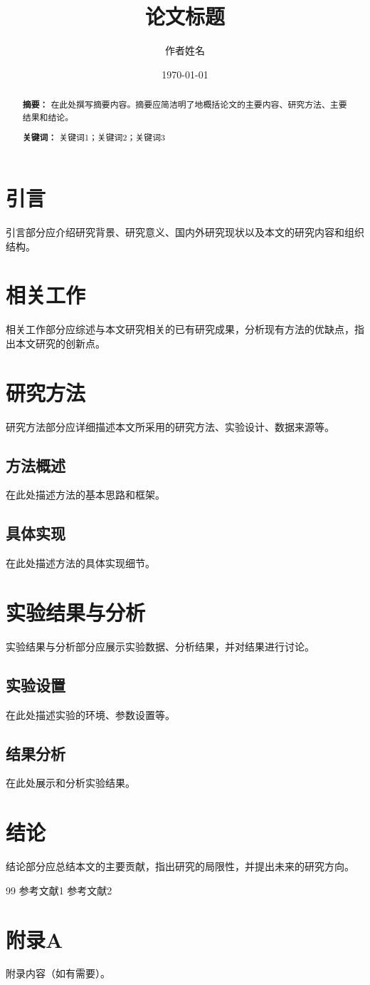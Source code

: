 \documentclass[12pt,a4paper]{article}
\title{论文标题}
\author{作者姓名}
\date{\today}
\begin{document}
\maketitle

\begin{abstract}
\textbf{摘要：} 在此处撰写摘要内容。摘要应简洁明了地概括论文的主要内容、研究方法、主要结果和结论。

\textbf{关键词：} 关键词1；关键词2；关键词3
\end{abstract}

\tableofcontents
\newpage

\section{引言}
引言部分应介绍研究背景、研究意义、国内外研究现状以及本文的研究内容和组织结构。

\section{相关工作}
相关工作部分应综述与本文研究相关的已有研究成果，分析现有方法的优缺点，指出本文研究的创新点。

\section{研究方法}
研究方法部分应详细描述本文所采用的研究方法、实验设计、数据来源等。

\subsection{方法概述}
在此处描述方法的基本思路和框架。

\subsection{具体实现}
在此处描述方法的具体实现细节。

\section{实验结果与分析}
实验结果与分析部分应展示实验数据、分析结果，并对结果进行讨论。

\subsection{实验设置}
在此处描述实验的环境、参数设置等。

\subsection{结果分析}
在此处展示和分析实验结果。

\section{结论}
结论部分应总结本文的主要贡献，指出研究的局限性，并提出未来的研究方向。

\begin{thebibliography}{99}
 参考文献1
 参考文献2
\end{thebibliography}

\appendix
\section{附录A}
附录内容（如有需要）。
\end{document}
